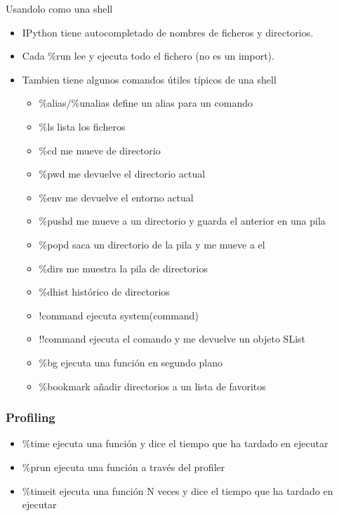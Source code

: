 \documentclass[10pt]{beamer}
\begin{document}
  \begin{frame}{Usandolo como una shell}
    \begin{itemize}
      \item IPython tiene autocompletado de nombres de ficheros y directorios.
      \item Cada \%run lee y ejecuta todo el fichero (no es un import).
      \item Tambien tiene algunos comandos útiles típicos de una shell
      \begin{itemize}
        \item \%alias/\%unalias define un alias para un comando
        \item \%ls lista los ficheros
        \item \%cd me mueve de directorio
        \item \%pwd me devuelve el directorio actual
        \item \%env me devuelve el entorno actual
        \item \%pushd me mueve a un directorio y guarda el anterior en una pila
        \item \%popd saca un directorio de la pila y me mueve a el
        \item \%dirs me muestra la pila de directorios
        \item \%dhist histórico de directorios
        \item !command ejecuta system(command)
        \item !!command ejecuta el comando y me devuelve un objeto SList
        \item \%bg ejecuta una función en segundo plano
        \item \%bookmark añadir directorios a un lista de favoritos
      \end{itemize}
    \end{itemize}
  \end{frame}

  \begin{frame}
    \frametitle{Profiling}
    \begin{itemize}
      \item \%time ejecuta una función y dice el tiempo que ha tardado en ejecutar
      \item \%prun ejecuta una función a través del profiler
      \item \%timeit ejecuta una función N veces y dice el tiempo que ha tardado en ejecutar
    \end{itemize}
  \end{frame}
  
\end{document}
